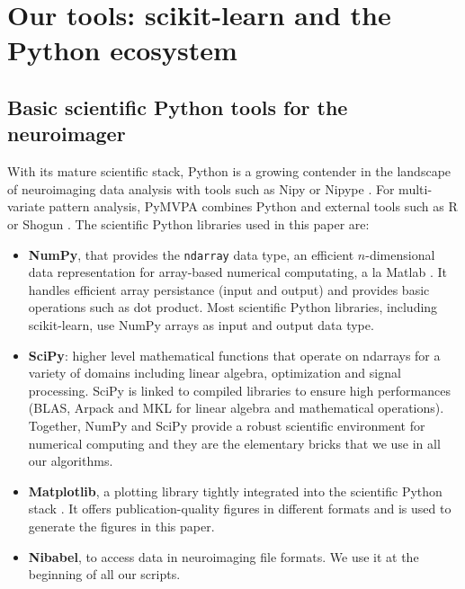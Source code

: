 \documentclass{frontiersSCNS} %
\begin{document}
\section{Our tools: scikit-learn and the Python ecosystem}

\subsection{Basic scientific Python tools for the neuroimager}

With its mature scientific stack, Python is a growing contender in the
landscape of neuroimaging data analysis with tools such as Nipy
\citep{millman2007analysis} or Nipype \citep{gorgolewski2011}.
For multi-variate pattern analysis, PyMVPA \citep{hanke2009pymvpa}
combines Python and external tools such as R or Shogun
\citep{sonnenburg2010}. 
The scientific Python libraries used in this paper are:
\begin{itemize}
    \item{\bf NumPy}, that provides the \verb!ndarray! data type, an efficient $n$-dimensional data
        representation for array-based numerical computating, a la Matlab
        \citep{vanderwalt2011}. It handles efficient array persistance
        (input and output) and provides basic operations such as dot
        product. Most scientific Python libraries, including scikit-learn, 
	use NumPy arrays
        as input and output data type.

    \item{\bf SciPy}: higher level mathematical functions that operate on ndarrays for
        a variety of domains including linear algebra, optimization and signal
        processing. SciPy is linked to compiled libraries to ensure high
        performances (BLAS, Arpack and MKL for linear algebra and mathematical
        operations).
        Together, NumPy and SciPy provide a robust scientific environment
        for numerical computing and they are the elementary bricks that we use in all our
        algorithms.

    \item{\bf Matplotlib}, a plotting library tightly integrated into the
        scientific Python stack \citep{hunter2007}. It offers publication-quality figures in
        different formats and is used to generate the figures in
	this paper.

    \item{\bf Nibabel}, to access data in neuroimaging file formats.
	We use it at the beginning of all our scripts.
\end{itemize}
\end{document}
